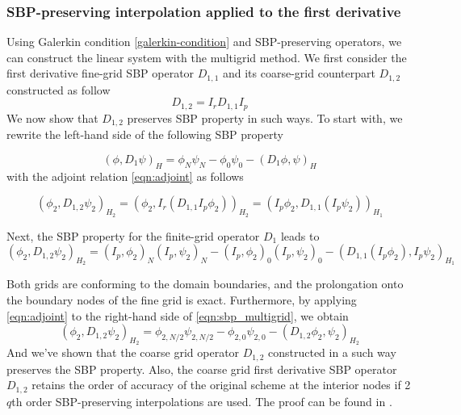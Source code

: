 \subsubsection{SBP-preserving interpolation applied to the first derivative}
Using Galerkin condition \autoref{galerkin-condition} and SBP-preserving operators, we can construct the linear system with the multigrid method. We first consider the first derivative fine-grid SBP operator $D_{1,1}$ and its coarse-grid counterpart $D_{1,2}$ constructed as follow
\begin{equation}
    D_{1,2} = I_r D_{1,1} I_p
\end{equation}
We now show that $D_{1,2}$ preserves SBP property in such ways. To start with, we rewrite the left-hand side of the following SBP property

\begin{equation}
    (\phi,D_1\psi)_H = \phi_N\psi_N - \phi_0\psi_0 - (D_1\phi,\psi)_H
\end{equation}
with the adjoint relation \autoref{eqn:adjoint} as follows

\begin{equation}
    (\phi_2,D_{1,2}\psi_2)_{H_2} = (\phi_2,I_r(D_{1,1}I_p\phi_2))_{H_2} = (I_p\phi_2,D_{1,1}(I_p\psi_2))_{H_1}
\end{equation}

Next, the SBP property for the finite-grid operator $D_1$ leads to
\begin{equation}
     (\phi_2,D_{1,2}\psi_2)_{H_2} = (I_p,\phi_2)_N(I_p,\psi_2)_N - (I_p,\phi_2)_0(I_p,\psi_2)_0 - (D_{1,1}(I_p\phi_2),I_p\psi_2)_{H_1}
     \label{eqn:sbp_multigrid}
\end{equation}

Both grids are conforming to the domain boundaries, and the prolongation onto the boundary nodes of the fine grid is exact. Furthermore, by applying \autoref{eqn:adjoint} to the right-hand side of \autoref{eqn:sbp_multigrid}, we obtain 
\begin{equation}
    (\phi_2,D_{1,2}\psi_2)_{H_2} = \phi_{2,N/2}\psi_{2,N/2} - \phi_{2,0}\psi_{2,0} - (D_{1,2}\phi_{2},\psi_{2})_{H_2}
\end{equation}
And we've shown that the coarse grid operator $D_{1,2}$ constructed in a such way preserves the SBP property. Also, the coarse grid first derivative SBP operator $D_{1,2}$ retains the order of accuracy of the original scheme at the interior nodes if 2$q$th order SBP-preserving interpolations are used. The proof can be found in \citep{RUGGIU2018216}.


